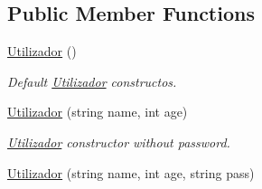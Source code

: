 \subsection*{Public Member Functions}
\begin{DoxyCompactItemize}
\item 
\hypertarget{class_utilizador_a264cb21da71b44fc2d5cfb21e58fa24a}{\hyperlink{class_utilizador_a264cb21da71b44fc2d5cfb21e58fa24a}{Utilizador} ()}\label{class_utilizador_a264cb21da71b44fc2d5cfb21e58fa24a}

\begin{DoxyCompactList}\small\item\em Default \hyperlink{class_utilizador}{Utilizador} constructos. \end{DoxyCompactList}\item 
\hypertarget{class_utilizador_a4ce0d50c55e4f03e61ffa97376a2f30c}{\hyperlink{class_utilizador_a4ce0d50c55e4f03e61ffa97376a2f30c}{Utilizador} (string name, int age)}\label{class_utilizador_a4ce0d50c55e4f03e61ffa97376a2f30c}

\begin{DoxyCompactList}\small\item\em \hyperlink{class_utilizador}{Utilizador} constructor without password. \end{DoxyCompactList}\item 
\hypertarget{class_utilizador_a8764eb80a3f0f8c352628272f62dbd6d}{\hyperlink{class_utilizador_a8764eb80a3f0f8c352628272f62dbd6d}{Utilizador} (string name, int age, string pass)}\label{class_utilizador_a8764eb80a3f0f8c352628272f62dbd6d}


\end{DoxyCompactItemize}
